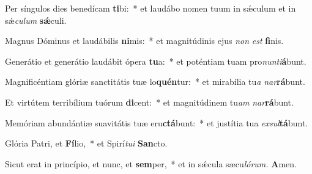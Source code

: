 \item Per síngulos dies benedícam \textbf{ti}bi:~* et laudábo nomen tuum in sǽculum et in sǽ\hspace{0.03em}\textit{culum} \textbf{sǽ}culi.
\item Magnus Dóminus et laudábilis \textbf{ni}mis:~* et magnitúdinis ejus \textit{non} \textit{est} \textbf{fi}nis.
\item Generátio et generátio laudábit ópera \textbf{tu}a:~* et poténtiam tuam pro\textit{nunti}\textbf{á}bunt.
\item Magnificéntiam glóriæ sanctitátis tuæ lo\textbf{quén}tur:~* et mirabília tu\hspace{0.03em}\textit{a} \textit{nar}\textbf{rá}bunt.
\item Et virtútem terribílium tuórum \textbf{di}cent:~* et magnitúdinem tu\hspace{0.03em}\textit{am} \textit{nar}\textbf{rá}bunt.
\item Memóriam abundántiæ suavitátis tuæ eru\textbf{ctá}bunt:~* et justítia tua \textit{exsul}\textbf{tá}bunt.
\item Glória Patri, et \textbf{Fí}lio,~* et Spirí\hspace{0.03em}\textit{tui} \textbf{San}cto.
\item Sicut erat in princípio, et nunc, et \textbf{sem}per,~* et in sǽcula sæcu\hspace{0.03em}\textit{lórum.} \textbf{A}men.